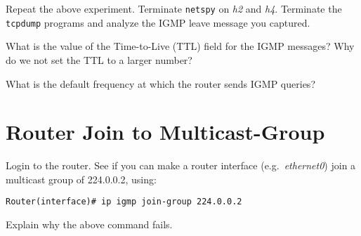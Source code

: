 \documentclass{../UTNetLab}
\begin{document}
    Repeat the above experiment.
    Terminate \lstinline{netspy} on \textit{h2} and \textit{h4}.
    Terminate the \lstinline{tcpdump} programs and analyze the IGMP leave message you captured.
    
    \begin{report}
    \item What is the value of the Time-to-Live (TTL) field for the IGMP messages?
    Why do we not set the TTL to a larger number?

    \item What is the default frequency at which the router sends IGMP queries?
    \end{report}

\section{Router Join to Multicast-Group}
    Login to the router.
    See if you can make a router interface (e.g.\ \textit{ethernet0}) join a multicast group of 224.0.0.2, using:
    \begin{lstlisting}[language={cisco}]
Router(interface)# ip igmp join-group 224.0.0.2
    \end{lstlisting}
    
    \begin{report}
    \item Explain why the above command fails.
    \end{report}
\end{document}
